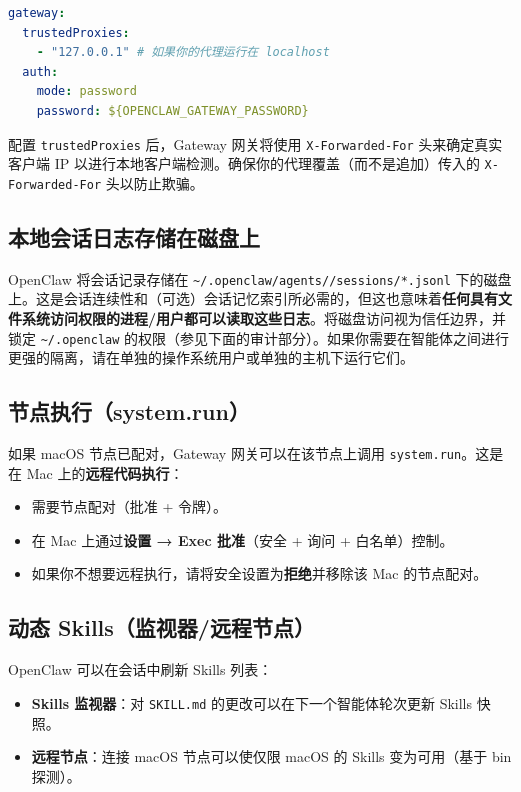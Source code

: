 \begin{lstlisting}[language=yaml]
gateway:
  trustedProxies:
    - "127.0.0.1" # 如果你的代理运行在 localhost
  auth:
    mode: password
    password: ${OPENCLAW_GATEWAY_PASSWORD}
\end{lstlisting}


配置 \texttt{trustedProxies} 后，Gateway 网关将使用 \texttt{X-Forwarded-For} 头来确定真实客户端 IP 以进行本地客户端检测。确保你的代理覆盖（而不是追加）传入的 \texttt{X-Forwarded-For} 头以防止欺骗。

\subsection{本地会话日志存储在磁盘上}


OpenClaw 将会话记录存储在 \texttt{\textasciitilde{}/.openclaw/agents//sessions/*.jsonl} 下的磁盘上。这是会话连续性和（可选）会话记忆索引所必需的，但这也意味着\textbf{任何具有文件系统访问权限的进程/用户都可以读取这些日志}。将磁盘访问视为信任边界，并锁定 \texttt{\textasciitilde{}/.openclaw} 的权限（参见下面的审计部分）。如果你需要在智能体之间进行更强的隔离，请在单独的操作系统用户或单独的主机下运行它们。

\subsection{节点执行（system.run）}


如果 macOS 节点已配对，Gateway 网关可以在该节点上调用 \texttt{system.run}。这是在 Mac 上的\textbf{远程代码执行}：

\begin{itemize}
  \item 需要节点配对（批准 + 令牌）。
  \item 在 Mac 上通过\textbf{设置 → Exec 批准}（安全 + 询问 + 白名单）控制。
  \item 如果你不想要远程执行，请将安全设置为\textbf{拒绝}并移除该 Mac 的节点配对。
\end{itemize}


\subsection{动态 Skills（监视器/远程节点）}


OpenClaw 可以在会话中刷新 Skills 列表：

\begin{itemize}
  \item \textbf{Skills 监视器}：对 \texttt{SKILL.md} 的更改可以在下一个智能体轮次更新 Skills 快照。
  \item \textbf{远程节点}：连接 macOS 节点可以使仅限 macOS 的 Skills 变为可用（基于 bin 探测）。
\end{itemize}


